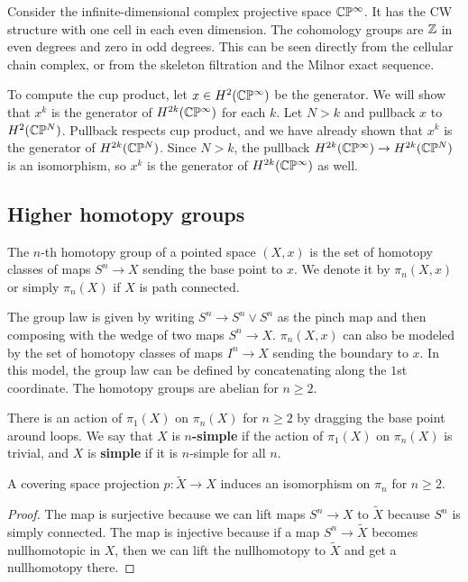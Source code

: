 \documentclass[12pt]{article}
\begin{document}
\begin{example}
    Consider the infinite-dimensional complex projective space $\mathbb{C}\mathbb{P}^\infty$. It has the CW structure with one cell in each even dimension. The cohomology groups are $\mathbb{Z}$ in even degrees and zero in odd degrees. This can be seen directly from the cellular chain complex, or from the skeleton filtration and the Milnor exact sequence. 

    To compute the cup product, let $x\in H^2(\mathbb{C}\mathbb{P}^\infty)$ be the generator. We will show that $x^k$ is the generator of $H^{2k}(\mathbb{C}\mathbb{P}^\infty)$ for each $k$. Let $N > k$ and pullback $x$ to $H^2(\mathbb{C}\mathbb{P}^N)$. Pullback respects cup product, and we have already shown that $x^k$ is the generator of $H^{2k}(\mathbb{C}\mathbb{P}^N)$. Since $N > k$, the pullback $H^{2k}(\mathbb{C}\mathbb{P}^\infty) \to H^{2k}(\mathbb{C}\mathbb{P}^N)$ is an isomorphism, so $x^k$ is the generator of $H^{2k}(\mathbb{C}\mathbb{P}^\infty)$ as well.
\end{example}


\subsection{Higher homotopy groups}

\begin{definition}
    The $n$-th homotopy group of a pointed space $(X,x)$ is the set of homotopy classes of maps $S^n \to X$ sending the base point to $x$. We denote it by $\pi_n(X,x)$ or simply $\pi_n(X)$ if $X$ is path connected.
\end{definition}
The group law is given by writing $S^n \to S^n \vee S^n$ as the pinch map and then composing with the wedge of two maps $S^n \to X$. $\pi_n(X,x)$ can also be modeled by the set of homotopy classes of maps $I^n \to X$ sending the boundary to $x$. In this model, the group law can be defined by concatenating along the $1$st coordinate. 
The homotopy groups are abelian for $n\geq 2$.

There is an action of $\pi_1(X)$ on $\pi_n(X)$ for $n\geq 2$ by dragging the base point around loops. We say that $X$ is \textbf{$n$-simple} if the action of $\pi_1(X)$ on $\pi_n(X)$ is trivial, and $X$ is \textbf{simple} if it is $n$-simple for all $n$. 

\begin{proposition}
    A covering space projection $p: \tilde X \to X$ induces an isomorphism on $\pi_n$ for $n\geq 2$.
\end{proposition}

\begin{proof}
    The map is surjective because we can lift maps $S^n \to X$ to $\tilde X$ because $S^n$ is simply connected. The map is injective because if a map $S^n \to \tilde X$ becomes nullhomotopic in $X$, then we can lift the nullhomotopy to $\tilde X$ and get a nullhomotopy there.
\end{proof}
\end{document}
